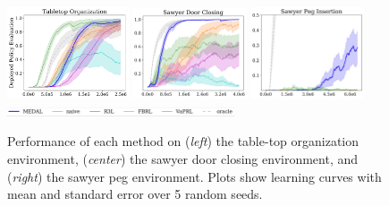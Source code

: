 \documentclass[nohyperref]{article}
\theoremstyle{plain}
\theoremstyle{definition}
\theoremstyle{remark}
\begin{document}
\begin{figure}[t]
    \centering
    \includegraphics[width=0.32\textwidth]{figures/tabletop_transfer.png}
    \includegraphics[width=0.3\textwidth]{figures/sawyer_door_transfer.png}
    \includegraphics[width=0.3\textwidth]{figures/sawyer_peg_transfer.png}
    \includegraphics[width=0.6\textwidth]{figures/legend.png}
    
    \caption{Performance of each method on (\textit{left}) the table-top organization environment, (\textit{center}) the sawyer door closing environment, and (\textit{right}) the sawyer peg environment. Plots show learning curves with mean and standard error over 5 random seeds.}
    \label{fig:benchmark_results}
\end{figure}
\end{document}
